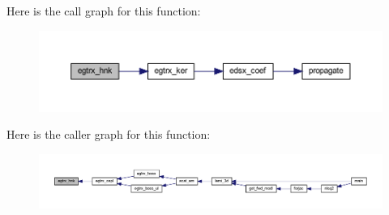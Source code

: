 Here is the call graph for this function\+:\nopagebreak
\begin{figure}[H]
\begin{center}
\leavevmode
\includegraphics[width=350pt]{Leroi_8f90_a5489646b1d19d3a2a814c56265bd78fb_cgraph}
\end{center}
\end{figure}
Here is the caller graph for this function\+:\nopagebreak
\begin{figure}[H]
\begin{center}
\leavevmode
\includegraphics[width=350pt]{Leroi_8f90_a5489646b1d19d3a2a814c56265bd78fb_icgraph}
\end{center}
\end{figure}
\mbox{\label{Leroi_8f90_aed79c3eb3332f2cd1b4c25c6c825e360}} 
